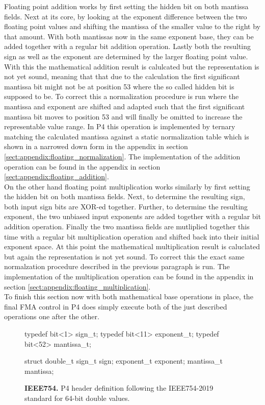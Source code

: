 Floating point addition works by first setting the hidden bit on both mantissa fields. Next at its core, by looking at the exponent difference between the two floating point values and shifting the mantissa of the smaller value to the right by that amount. With both mantissas now in the same exponent base, they can be added together with a regular bit addition operation. Lastly both the resulting sign as well as the exponent are determined by the larger floating point value. With this the mathematical addition result is calulcated but the representation is not yet sound, meaning that that due to the calculation the first significant mantissa bit might not be at position 53 where the so called hidden bit is supposed to be. To correct this a normalization procedure is run where the mantissa and exponent are shifted and adapted such that the first significant mantissa bit moves to position 53 and will finally be omitted to increase the representable value range. In P4 this operation is implemented by ternary matching the calculated mantissa against a static normalization table which is shown in a narrowed down form in the appendix in section \ref{sect:appendix:floating_normalization}. The implementation of the addition operation can be found in the appendix in section \ref{sect:appendix:floating_addition}.\\

On the other hand floating point multiplication works similarly by first setting the hidden bit on both mantissa fields. Next, to determine the resulting sign, both input sign bits are XOR-ed together. Further, to determine the resulting exponent, the two unbiased input exponents are added together with a regular bit addition operation. Finally the two mantissa fields are mutliplied together this time with a regular bit multiplication operation and shifted back into their initial exponent space. At this point the mathematical multiplication result is caluclated but again the representation is not yet sound. To correct this the exact same normalzation procedure described in the previous paragraph is run. The implementation of the multiplication operation can be found in the appendix in section \ref{sect:appendix:floating_multiplication}.\\

To finish this section now with both mathematical base operations in place, the final FMA control in P4 does simply execute both of the just described operations one after the other.

\captionsetup[figure]{skip=-10pt} %
\begin{figure}[ht]
  \begin{P4}
typedef bit<1> sign_t;
typedef bit<11> exponent_t;
typedef bit<52> mantissa_t;

struct double_t {
  sign_t sign;
  exponent_t exponent;
  mantissa_t mantissa;
}\end{P4}
  \caption[Double header definition in P4]{
    \textbf{IEEE754.} P4 header definition following the IEEE754-2019 standard for 64-bit double values.
  }
  \label{fig:double_header}
\end{figure}

